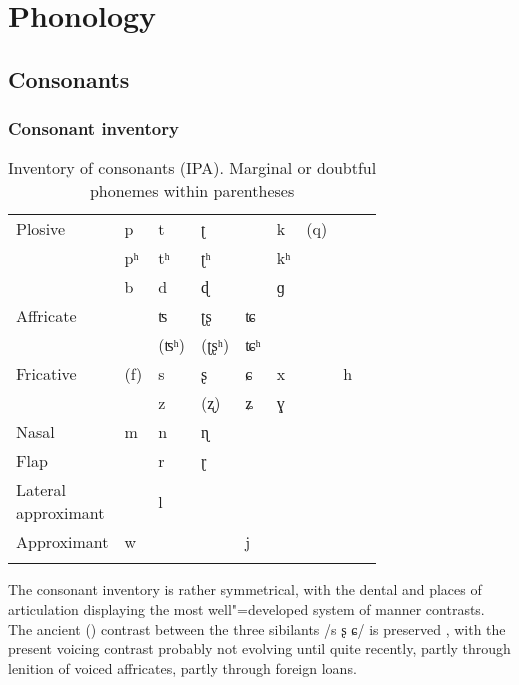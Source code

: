\chapter{Phonology}
\label{chap:3}

\section{Consonants}
\label{sec:3-1}

\subsection{Consonant inventory}
\label{subsec:3-1-0}

\begin{table}[b]
\caption{Inventory of consonants (IPA). Marginal or doubtful phonemes within parentheses}
\begin{tabularx}{\textwidth}{ P{20mm} Q Q Q Q Q Q Q Q }
\lsptoprule
&
 &
 &
 &
 &
 &
 &
 \\\midrule
Plo\-sive
&
p &
t &
ʈ &
&
k &
(q) &
\\
&
pʰ &
tʰ &
ʈʰ &
&
kʰ &
&
\\
&
b &
d &
ɖ &
&
ɡ &
&
\\
Affricate
&
&
ʦ &
ʈʂ &
ʨ &
&
&
\\
&
&
(ʦʰ) &
(ʈʂʰ) &
ʨʰ &
&
&
\\
Fricative
&
(f) &
s &
ʂ &
ɕ &
x &
&
h\\
&
&
z &
(ʐ) &
ʑ &
ɣ &
&
\\
Nasal
&
m &
n &
ɳ &
&
&
&
\\
Flap
&
&
r &
ɽ &
&
&
&
\\
\parbox[t]{2cm}{Lateral\\[-.3em]approximant}
&
&
l &
&
&
&
&
\\
\mbox{Approximant\hspace*{-2mm}}
&
w &
&
&
j &
&
&
\\\lspbottomrule
\end{tabularx}
\label{tab:3-1}
\end{table}

\largerpage[-1]
The consonant inventory is rather symmetrical, with the dental and  places of articulation displaying the most well"=developed system of manner contrasts. The ancient (\iliOIA) contrast between the three sibilants /s ʂ ɕ/ is preserved \citep[375]{cardonaluraghi2009}, with the present voicing contrast probably not evolving until quite recently, partly through lenition of voiced affricates, partly through foreign loans. 


